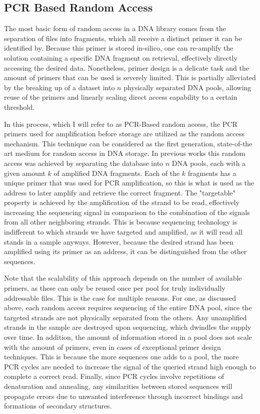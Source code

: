 \documentclass[a4paper,conference]{IEEEtran}
\begin{document}
\subsection{PCR Based Random Access}
The most basic form of random access in a DNA library comes from the separation of files into fragments, which all receive a distinct primer it can be identified by. Because this primer is stored in-silico, one can re-amplify the solution containing a specific DNA fragment on retrieval, effectively directly accessing the desired data. Nonetheless, primer design is a delicate task and the amount of primers that can be used is severely limited. This is partially alleviated by the breaking up of a dataset into $n$ physically separated DNA pools, allowing reuse of the primers and linearly scaling direct access capability to a certain threshold.

In this process, which I will refer to as PCR-Based random access, the PCR primers used for amplification before storage are utilized as the random access mechanism. This technique can be considered as the first generation, state-of-the art medium for random access in DNA storage. In previous works \cite{} this random access was achieved by separating the database into $n$ DNA pools, each with a given amount $k$ of amplified DNA fragments. Each of the $k$ fragments has a unique primer that was used for PCR amplification, so this is what is used as the address to later amplify and retrieve the correct fragment. The "targetable" property is achieved by the amplification of the strand to be read, effectively increasing the sequencing signal in comparison to the combination of the signals from all other neighboring strands. This is because sequencing technology is indifferent to which strands we have targeted and amplified, as it will read all stands in a sample anyways. However, because the desired strand has been amplified using its primer as an address, it can be distinguished from the other sequences.

Note that the scalability of this approach depends on the number of available primers, as these can only be reused once per pool for truly individually addressable files. This is the case for multiple reasons. For one, as discussed above, each random access requires sequencing of the entire DNA pool, since the targeted strands are not physically separated from the others. Any unamplified strands in the sample are destroyed upon sequencing, which dwindles the supply over time. In addition, the amount of information stored in a pool does not scale with the amount of primers, even in cases of exceptional primer design techniques. This is because the more sequences one adds to a pool, the more PCR cycles are needed to increase the signal of the queried strand high enough to complete a correct read. Finally, since PCR cycles involve repetitions of denaturation and annealing, any similarities between stored sequences will propagate errors due to unwanted interference through incorrect bindings and formations of secondary structures.
\end{document}
